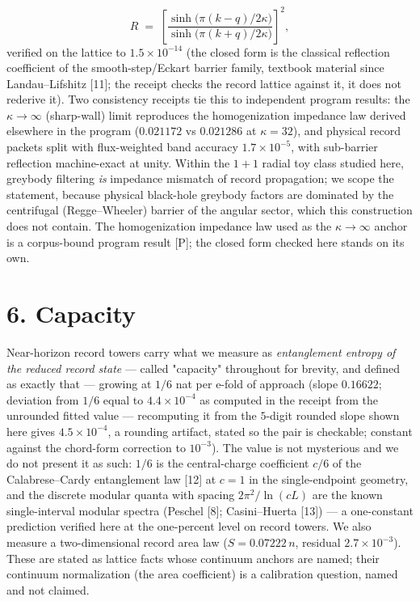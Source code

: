 \documentclass[11pt]{article}
\begin{document}
\[
R \;=\;
\left[\frac{\sinh\!\bigl(\pi(k-q)/2\kappa\bigr)}
           {\sinh\!\bigl(\pi(k+q)/2\kappa\bigr)}\right]^{2},
\]
verified on the lattice to $1.5\times 10^{-14}$ (the closed form is the classical reflection coefficient of the smooth-step/Eckart barrier family, textbook material since Landau–Lifshitz [11]; the receipt checks the record lattice against it, it does not rederive it).  Two consistency receipts tie this to independent program results: the $\kappa \to \infty$ (sharp-wall) limit reproduces the homogenization impedance law derived elsewhere in the program ($0.021172$ vs $0.021286$ at $\kappa = 32$), and physical record packets split with flux-weighted band accuracy $1.7\times 10^{-5}$, with sub-barrier reflection machine-exact at unity.  Within the $1{+}1$ radial toy class studied here, greybody filtering \emph{is} impedance mismatch of record propagation; we scope the statement, because physical black-hole greybody factors are dominated by the centrifugal (Regge–Wheeler) barrier of the angular sector, which this construction does not contain.  The homogenization impedance law used as the $\kappa \to \infty$ anchor is a corpus-bound program result [P]; the closed form checked here stands on its own.

\section*{6. Capacity}
Near-horizon record towers carry what we measure as \emph{entanglement entropy of the reduced record state} — called "capacity" throughout for brevity, and defined as exactly that — growing at $1/6$ nat per e-fold of approach (slope $0.16622$; deviation from $1/6$ equal to $4.4\times 10^{-4}$ as computed in the receipt from the unrounded fitted value — recomputing it from the $5$-digit rounded slope shown here gives $4.5\times 10^{-4}$, a rounding artifact, stated so the pair is checkable; constant against the chord-form correction to $10^{-3}$).  The value is not mysterious and we do not present it as such: $1/6$ is the central-charge coefficient $c/6$ of the Calabrese–Cardy entanglement law [12] at $c = 1$ in the single-endpoint geometry, and the discrete modular quanta with spacing $2\pi^2/\ln(cL)$ are the known single-interval modular spectra (Peschel [8]; Casini–Huerta [13]) — a one-constant prediction verified here at the one-percent level on record towers.  We also measure a two-dimensional record area law ($S = 0.07222\,n$, residual $2.7\times 10^{-3}$).  These are stated as lattice facts whose continuum anchors are named; their continuum normalization (the area coefficient) is a calibration question, named and not claimed.
\end{document}

